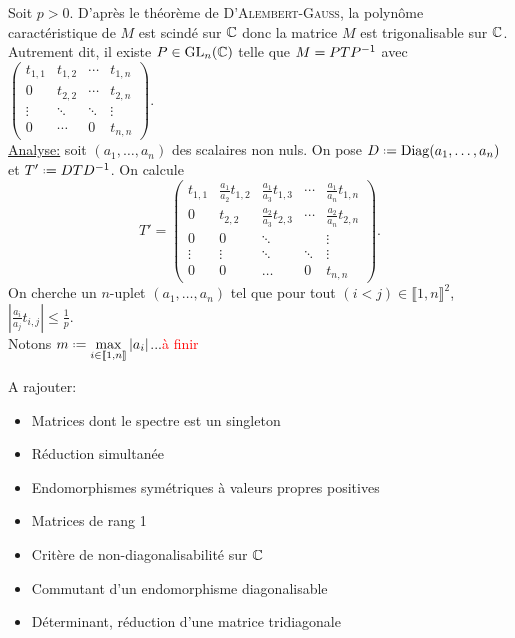 \begin{solution}
    Soit $p > 0$. D'après le théorème de \textsc{D'Alembert}-\textsc{Gauss}, la polynôme caractéristique de $M$ est scindé sur $\mathbb{C}$ donc la matrice $M$ est trigonalisable sur $\mathbb{C}$. Autrement dit, il existe $P \in \mathrm{GL}_n(\mathbb{C})$ telle que $M = P T P^{-1}$ avec 
    $\begin{pmatrix}
        t_{1,1} & t_{1,2} & \cdots & t_{1,n} \\
        0 & t_{2,2} & \cdots & t_{2,n} \\
        \vdots & \ddots & \ddots & \vdots \\
        0 & \cdots & 0 & t_{n,n}
    \end{pmatrix}. $ \\
    \underline{Analyse:} soit $(a_1, \dots, a_n)$ des scalaires non nuls. On pose $D \defeq \Diag(a_1, \dots, a_n)$ et $T' \defeq D T \Inv{D}$. On calcule
    $$T'=
    \begin{pmatrix}
        t_{1,1} & \frac{a_1}{a_2}t_{1,2} & \frac{a_1}{a_3} t_{1,3} & \cdots & \frac{a_1}{a_n} t_{1,n} \\
        0 & t_{2,2} & \frac{a_2}{a_3}t_{2,3} & \cdots & \frac{a_2}{a_n} t_{2,n} \\
        0 & 0 & \ddots & & \vdots \\
        \vdots & \vdots & \ddots & \ddots & \vdots \\
        0 & 0 & \dots & 0 & t_{n,n}
    \end{pmatrix}.
    $$
    On cherche un $n$-uplet $(a_1, \dots, a_n)$ tel que pour tout $(i < j) \in \llbracket 1, n \rrbracket^2$, $\left| \frac{a_i}{a_j}t_{i,j} \right| \leqslant \frac{1}{p}$. \\
    Notons $m \defeq \max\limits_{i \in \llbracket 1, n \rrbracket} |a_i|$...\textcolor{red}{à finir}
\end{solution}

A rajouter:
\begin{itemize}
    \item Matrices dont le spectre est un singleton
    \item Réduction simultanée
    \item Endomorphismes symétriques à valeurs propres positives
    \item Matrices de rang 1
    \item Critère de non-diagonalisabilité sur $\mathbb{C}$
    \item Commutant d'un endomorphisme diagonalisable 
    \item Déterminant, réduction d'une matrice tridiagonale 
\end{itemize}

